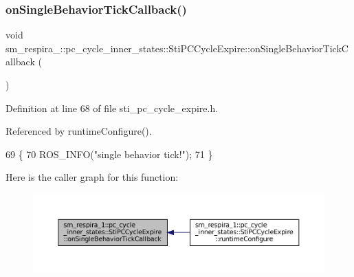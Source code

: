 \subsubsection{\texorpdfstring{on\+Single\+Behavior\+Tick\+Callback()}{onSingleBehaviorTickCallback()}}
{\footnotesize\ttfamily void sm\+\_\+respira\+\_\+::pc\+\_\+cycle\+\_\+inner\+\_\+states\+::\+Sti\+P\+C\+Cycle\+Expire\+::on\+Single\+Behavior\+Tick\+Callback (\begin{DoxyParamCaption}{ }\end{DoxyParamCaption})\hspace{0.3cm}{\ttfamily [inline]}}



Definition at line 68 of file sti\+\_\+pc\+\_\+cycle\+\_\+expire.\+h.



Referenced by runtime\+Configure().


\begin{DoxyCode}
69   \{
70     ROS\_INFO(\textcolor{stringliteral}{"single behavior tick!"});
71   \}
\end{DoxyCode}
Here is the caller graph for this function\+:
\nopagebreak
\begin{figure}[H]
\begin{center}
\leavevmode
\includegraphics[width=350pt]{structsm__respira__1_1_1pc__cycle__inner__states_1_1StiPCCycleExpire_a36833891f00ebabff74a5570627405a6_icgraph}
\end{center}
\end{figure}
\mbox{\label{structsm__respira__1_1_1pc__cycle__inner__states_1_1StiPCCycleExpire_a7fd642e0a6c10ef251fd3a6b8c8752ac}} 
